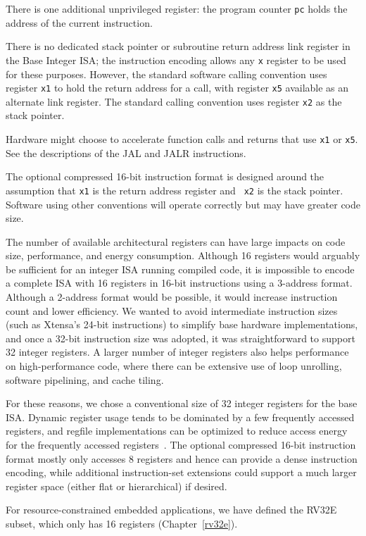 There is one additional unprivileged register: the program counter {\tt pc}
holds the address of the current instruction.

\begin{commentary}
There is no dedicated stack pointer or subroutine return address link
register in the Base Integer ISA; the instruction encoding allows any
{\tt x} register to be used for these purposes. However, the standard
software calling convention uses register {\tt x1} to hold the return
address for a call, with register {\tt x5} available as an alternate
link register.
The standard calling convention uses register {\tt x2} as the stack
pointer.

Hardware might choose to accelerate function calls and returns that
use {\tt x1} or {\tt x5}. See the descriptions of the JAL and JALR
instructions.

The optional compressed 16-bit instruction format is designed around
the assumption that {\tt x1} is the return address register and {\tt
 x2} is the stack pointer. Software using other conventions will
operate correctly but may have greater code size.

The number of available architectural registers can have large impacts
on code size, performance, and energy consumption.  Although 16
registers would arguably be sufficient for an integer ISA running
compiled code, it is impossible to encode a complete ISA with 16
registers in 16-bit instructions using a 3-address format.  Although a
2-address format would be possible, it would increase instruction
count and lower efficiency.  We wanted to avoid intermediate
instruction sizes (such as Xtensa's 24-bit instructions) to simplify
base hardware implementations, and once a 32-bit instruction size was
adopted, it was straightforward to support 32 integer registers.  A
larger number of integer registers also helps performance on
high-performance code, where there can be extensive use of loop
unrolling, software pipelining, and cache tiling.

For these reasons, we chose a conventional size of 32 integer
registers for the base ISA.  Dynamic register usage tends to be
dominated by a few frequently accessed registers, and regfile
implementations can be optimized to reduce access energy for the
frequently accessed registers~\cite{jtseng:sbbci}.  The optional
compressed 16-bit instruction format mostly only accesses 8 registers
and hence can provide a dense instruction encoding, while additional
instruction-set extensions could support a much larger register space
(either flat or hierarchical) if desired.

For resource-constrained embedded applications, we have defined the
RV32E subset, which only has 16 registers (Chapter~\ref{rv32e}).
\end{commentary}

